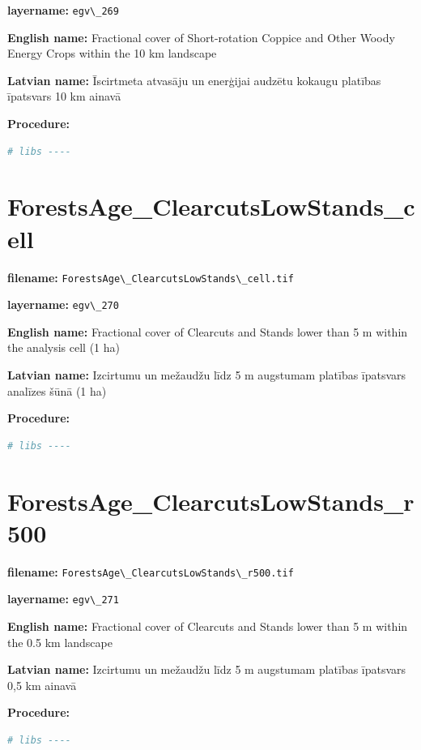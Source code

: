 \documentclass[
]{book}
\newcommand{\passthrough}[1]{#1}
\begin{document}
\textbf{layername:} \passthrough{\lstinline!egv\_269!}

\textbf{English name:} Fractional cover of Short-rotation Coppice and Other Woody Energy Crops within the 10 km landscape

\textbf{Latvian name:} Īscirtmeta atvasāju un enerģijai audzētu kokaugu platības īpatsvars 10 km ainavā

\textbf{Procedure:}

\begin{lstlisting}[language=R]
# libs ----
\end{lstlisting}

\section{ForestsAge\_ClearcutsLowStands\_cell}\label{ch06.270}

\textbf{filename:} \passthrough{\lstinline!ForestsAge\_ClearcutsLowStands\_cell.tif!}

\textbf{layername:} \passthrough{\lstinline!egv\_270!}

\textbf{English name:} Fractional cover of Clearcuts and Stands lower than 5 m within the analysis cell (1 ha)

\textbf{Latvian name:} Izcirtumu un mežaudžu līdz 5 m augstumam platības īpatsvars analīzes šūnā (1 ha)

\textbf{Procedure:}

\begin{lstlisting}[language=R]
# libs ----
\end{lstlisting}

\section{ForestsAge\_ClearcutsLowStands\_r500}\label{ch06.271}

\textbf{filename:} \passthrough{\lstinline!ForestsAge\_ClearcutsLowStands\_r500.tif!}

\textbf{layername:} \passthrough{\lstinline!egv\_271!}

\textbf{English name:} Fractional cover of Clearcuts and Stands lower than 5 m within the 0.5 km landscape

\textbf{Latvian name:} Izcirtumu un mežaudžu līdz 5 m augstumam platības īpatsvars 0,5 km ainavā

\textbf{Procedure:}

\begin{lstlisting}[language=R]
# libs ----
\end{lstlisting}
\end{document}
